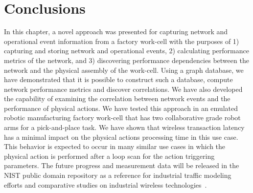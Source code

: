\section{Conclusions} \label{gdbappl:sec::conclusion}
In this chapter, a novel approach was presented for capturing network and operational event information from a factory work-cell with the  purposes of 1) capturing and storing network and operational events, 2) calculating performance metrics of the network, and 3) discovering performance dependencies between the network and the physical assembly of the work-cell. Using a graph database, we have demonstrated that it is possible to construct such a database, compute network performance metrics and discover correlations. We have also developed the capability of examining the correlation between network events and the performance of physical actions. We have tested this approach in an emulated robotic manufacturing factory work-cell that has two collaborative grade robot arms for a pick-and-place task. We have shown that wireless transaction latency has a minimal impact on the physical actions processing time in this use case. This behavior is expected to occur in many similar use cases in which the physical action is performed after a loop scan for the action triggering parameters. 
The future progress and measurement data will be released in the NIST public domain repository as a reference for industrial traffic modeling efforts and comparative studies on industrial wireless technologies~\cite{Candell2019PROJECTURL}.


